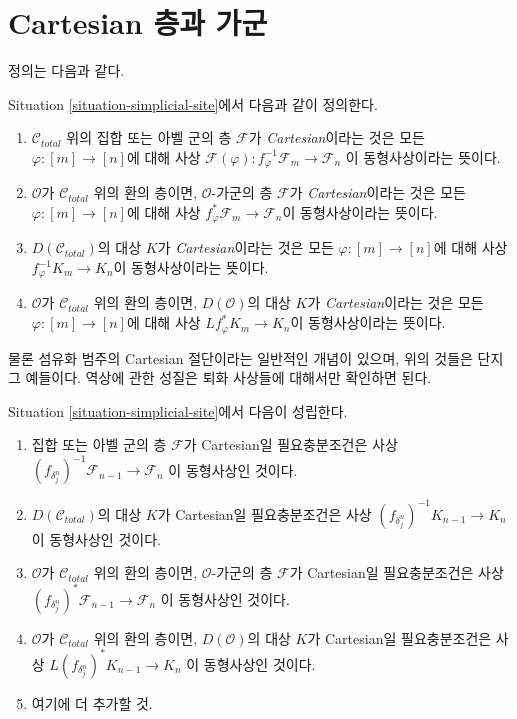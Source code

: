 \section{Cartesian 층과 가군}
\label{section-cartesian}

\noindent
정의는 다음과 같다.

\begin{definition}
\label{definition-cartesian-sheaf}
Situation \ref{situation-simplicial-site}에서 다음과 같이 정의한다.
\begin{enumerate}
\item $\mathcal{C}_{total}$ 위의 집합 또는 아벨 군의 층
$\mathcal{F}$가 {\it Cartesian}이라는 것은 모든
$\varphi : [m] \to [n]$에 대해 사상
$\mathcal{F}(\varphi) : f_\varphi^{-1}\mathcal{F}_m \to \mathcal{F}_n$
이 동형사상이라는 뜻이다.
\item $\mathcal{O}$가 $\mathcal{C}_{total}$ 위의 환의 층이면,
$\mathcal{O}$-가군의 층 $\mathcal{F}$가 {\it Cartesian}이라는 것은
모든 $\varphi : [m] \to [n]$에 대해 사상
$f_\varphi^*\mathcal{F}_m \to \mathcal{F}_n$이 동형사상이라는 뜻이다.
\item $D(\mathcal{C}_{total})$의 대상 $K$가 {\it Cartesian}이라는 것은
모든 $\varphi : [m] \to [n]$에 대해 사상
$f_\varphi^{-1}K_m \to K_n$이 동형사상이라는 뜻이다.
\item $\mathcal{O}$가 $\mathcal{C}_{total}$ 위의 환의 층이면,
$D(\mathcal{O})$의 대상 $K$가 {\it Cartesian}이라는 것은
모든 $\varphi : [m] \to [n]$에 대해 사상
$Lf_\varphi^*K_m \to K_n$이 동형사상이라는 뜻이다.
\end{enumerate}
\end{definition}

\noindent
물론 섬유화 범주의 Cartesian 절단이라는 일반적인 개념이 있으며,
위의 것들은 단지 그 예들이다.
역상에 관한 성질은 퇴화 사상들에 대해서만 확인하면 된다.

\begin{lemma}
\label{lemma-check-cartesian-module}
Situation \ref{situation-simplicial-site}에서 다음이 성립한다.
\begin{enumerate}
\item 집합 또는 아벨 군의 층 $\mathcal{F}$가 Cartesian일 필요충분조건은
사상
$(f_{\delta^n_j})^{-1}\mathcal{F}_{n - 1} \to \mathcal{F}_n$
이 동형사상인 것이다.
\item $D(\mathcal{C}_{total})$의 대상 $K$가 Cartesian일 필요충분조건은
사상\newline
$(f_{\delta^n_j})^{-1}K_{n - 1} \to K_n$
이 동형사상인 것이다.
\item $\mathcal{O}$가 $\mathcal{C}_{total}$ 위의 환의 층이면,
$\mathcal{O}$-가군의 층 $\mathcal{F}$가 Cartesian일 필요충분조건은
사상
$(f_{\delta^n_j})^*\mathcal{F}_{n - 1} \to \mathcal{F}_n$
이 동형사상인 것이다.
\item $\mathcal{O}$가 $\mathcal{C}_{total}$ 위의 환의 층이면,
$D(\mathcal{O})$의 대상 $K$가 Cartesian일 필요충분조건은
사상
$L(f_{\delta^n_j})^*K_{n - 1} \to K_n$
이 동형사상인 것이다.
\item 여기에 더 추가할 것.
\end{enumerate}
\end{lemma}

